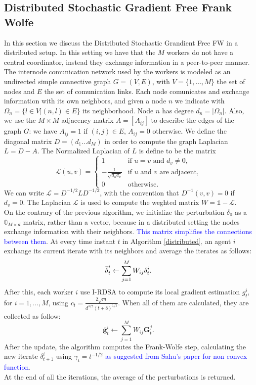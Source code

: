 \subsection{Distributed Stochastic Gradient Free Frank Wolfe}
In this section we discuss the Distributed Stochastic Grandient Free FW in a distributed setup. In this setting we have that the $M$ workers do not have a central coordinator, instead they exchange information in a peer-to-peer manner. The internode comunication network used by the workers is modeled as an undirected simple connective graph $G=(V,E)$, with $V=\{1, \dots, M\}$ the set of nodes and $E$ the set of comunication links. Each node comunicates and exchange information with its own neighbors, and given a node $n$ we indicate with $\Omega_n = \{l \in V | (n,l)\in E\}$ its neighborhood. Node $n$ has degree $d_n = |\Omega_n|$. Also, we use the $M \times M$ adjacency matrix $A=[A_{ij}]$ to describe the edges of the graph $G$: we have $A_{ij}=1$ if $(i,j) \in E$, $A_{ij}=0$ otherwise. We define the diagonal matrix $D=(d_1 \dots d_M)$ in order to compute the graph Laplacian $L=D-A$. The Normalized Laplacian of $L$ is define to be the matrix
\[
\mathcal{L}(u,v)=
\begin{cases}
	1 & \text{if $u=v$ and }d_v\ne0, \\
	-\frac{1}{\sqrt{d_ud_v}} & \text{if $u$ and $v$ are adjacent,}\\
	0 & \text{otherwise.}
	
\end{cases}
\]
We can write $\mathcal{L} = D^{-1/2}LD^{-1/2}$, with the convention that $D^{-1}(v,v) = 0$ if $d_v=0$. The Laplacian $\mathcal{L}$ is used to compute the weghted matrix $W = \mathbb{1}- \mathcal{L}$.\\
On the contrary of the previous algorithm, we initialize the perturbation \boldmath$\delta_0$ as a $\mathbb{0}_{M \times d}$ matrix, rather than a vector, because in a distributed setting the nodes exchange information with their neighbors. \textcolor{blue}{This matrix simplifies the connections between them}. At every time instant $t$ in Algorithm \ref{distributed}, an agent $i$ exchange its current iterate with its neighbors and average the iterates as follows:
\[\bar{\text{\boldmath}\delta}_t^i \leftarrow \sum_{j=1}^{M} W_{ij}\text{\boldmath}\delta_t^i.\]
After this, each worker $i$ use I-RDSA to compute its local gradient estimation $g_t^i$, for $i= 1, \dots, M$, using $c_t = \frac{2\sqrt{m}}{d^{3/2}(t+8)^{1/3}}$. When all of them are calculated, they are collected as follow:
\[ \bar{\mathbf{g}}_t^i \leftarrow \sum_{j=1}^{M} W_{ij}\mathbf{G}_t^j.\]
After the update, the algorithm computes the Frank-Wolfe step, calculating the new iterate \boldmath$\delta_{t+1}^i$ using $\gamma_t= t^{-1/2}$ \textcolor{blue}{as suggested from Sahu's paper for non convex function}.\\
At the end of all the iterations, the average of the perturbations is returned.\\

